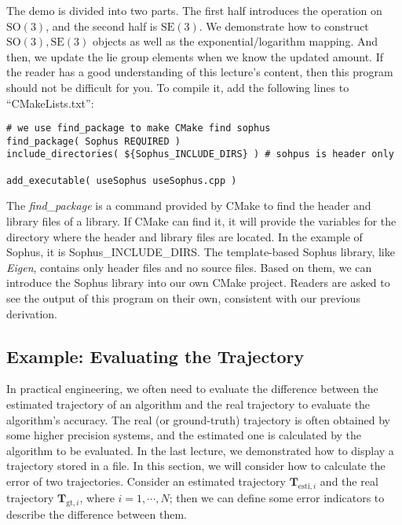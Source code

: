 The demo is divided into two parts. The first half introduces the operation on $\mathrm{SO}(3)$, and the second half is $\mathrm{SE}(3)$. We demonstrate how to construct $\mathrm{SO}(3), \mathrm{SE}(3)$ objects as well as the exponential/logarithm mapping. And then, we update the lie group elements when we know the updated amount. If the reader has a good understanding of this lecture's content, then this program should not be difficult for you. To compile it, add the following lines to ``CMakeLists.txt'':

\begin{lstlisting}[caption=slambook2/ch4/useSophus/CMakeLists.txt]
# we use find_package to make CMake find sophus
find_package( Sophus REQUIRED )
include_directories( ${Sophus_INCLUDE_DIRS} ) # sohpus is header only

add_executable( useSophus useSophus.cpp )
\end{lstlisting}


The \textit{find\_package} is a command provided by CMake to find the header and library files of a library. If CMake can find it, it will provide the variables for the directory where the header and library files are located. In the example of Sophus, it is Sophus\_INCLUDE\_DIRS. The template-based Sophus library, like \textit{Eigen}, contains only header files and no source files. Based on them, we can introduce the Sophus library into our own CMake project. Readers are asked to see the output of this program on their own, consistent with our previous derivation.

\subsection{Example: Evaluating the Trajectory}
In practical engineering, we often need to evaluate the difference between the estimated trajectory of an algorithm and the real trajectory to evaluate the algorithm's accuracy. The real (or ground-truth) trajectory is often obtained by some higher precision systems, and the estimated one is calculated by the algorithm to be evaluated. In the last lecture, we demonstrated how to display a trajectory stored in a file. In this section, we will consider how to calculate the error of two trajectories. Consider an estimated trajectory $\mathbf{T}_{\mathrm{esti}, i}$ and the real trajectory $\mathbf{T}_{\mathrm{gt},i}$, where $i=1,\cdots, N$; then we can define some error indicators to describe the difference between them.

